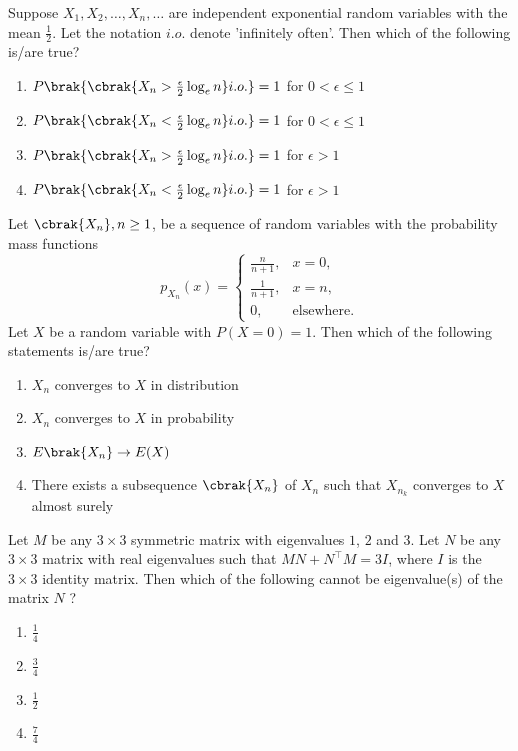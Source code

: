     \item Suppose $X_1, X_2, \dots, X_{n}, \dots$ are independent exponential random variables with the mean $\frac{1}{2}$. Let the notation $i.o.$ denote 'infinitely often'. Then which of the following is/are true?
        \begin{enumerate}
            \item $P\brak{\cbrak{X_{n}>\frac{\epsilon}{2}\log_{e}n}i.o.}=1$ for $0<\epsilon\leq1$
            \item $P\brak{\cbrak{X_{n}<\frac{\epsilon}{2}\log_{e}n}i.o.}=1$ for $0<\epsilon\leq1$
            \item $P\brak{\cbrak{X_{n}>\frac{\epsilon}{2}\log_{e}n}i.o.}=1$ for $\epsilon>1$
            \item $P\brak{\cbrak{X_{n}<\frac{\epsilon}{2}\log_{e}n}i.o.}=1$ for $\epsilon>1$
        \end{enumerate}

    \item Let $\cbrak{X_{n}}, n\geq1$, be a sequence of random variables with the probability mass functions $$p_{X_{n}}(x)=
        \begin{cases}
            \frac{n}{n+1}, & x=0,\\
            \frac{1}{n+1}, & x = n, \\
            0, & \text{elsewhere.}
        \end{cases}$$
            Let $X$ be a random variable with $P(X = 0) = 1$. Then which of the following statements is/are true?
            \begin{enumerate}
                \item $X_{n}$ converges to $X$ in distribution
                \item $X_{n}$ converges to $X$ in probability
                \item $E\brak{X_{n}}\to E(X)$ 
                \item There exists a subsequence $\cbrak{X_{n}}$ of $X_{n}$ such that $X_{n_{k}}$ converges to $X$ almost surely
            \end{enumerate}

        \item Let $M$ be any $3 \times 3$ symmetric matrix with eigenvalues $1$, $2$ and $3$. Let $N$ be any $3 \times 3$ matrix with real eigenvalues such that $MN + N^\top M = 3I$, where $I$ is the $3 \times 3$ identity matrix. Then which of the following cannot be eigenvalue(s) of the matrix $N$ ?
            \begin{enumerate}
                \item $\frac{1}{4}$
                \item $\frac{3}{4}$
                \item $\frac{1}{2}$
                \item $\frac{7}{4}$
            \end{enumerate}

